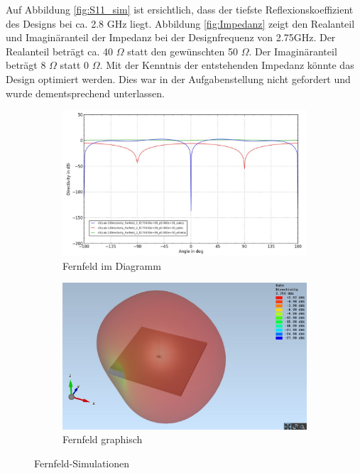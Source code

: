 Auf Abbildung \ref{fig:S11_sim} ist ersichtlich, dass der tiefste Reflexionskoeffizient des Designs bei ca. 2.8 GHz liegt.
Abbildung \ref{fig:Impedanz} zeigt den Realanteil und Imaginäranteil der Impedanz bei der Designfrequenz von 2.75GHz. Der Realanteil beträgt ca. 40 $\Omega$ statt den gewünschten 50 $\Omega$. Der Imaginäranteil beträgt 8 $\Omega$ statt 0 $\Omega$. Mit der Kenntnis der entstehenden Impedanz könnte das Design optimiert werden. Dies war in der Aufgabenstellung nicht gefordert und wurde dementsprechend unterlassen.

\begin{figure}[htbp]
	\begin{center}
		\begin{subfigure}[t]{0.49\textwidth}
			\begin{center}
				\includegraphics[width=\textwidth]{pic/Simulationen/Simulation_Farfield_dia.JPG}
				\caption{Fernfeld im Diagramm}
				\label{fig:Farfield_dia}
			\end{center}
		\end{subfigure}
		\begin{subfigure}[t]{0.49\textwidth}
			\begin{center}
				\includegraphics[width=\textwidth]{pic/Simulationen/Simulation_Farfield.JPG}
				\caption{Fernfeld graphisch}
				\label{fig:Farfield_graph}
			\end{center}
		\end{subfigure}
		\caption{Fernfeld-Simulationen}
		\label{fig:Simulationen_2}
	\end{center}
\end{figure}

